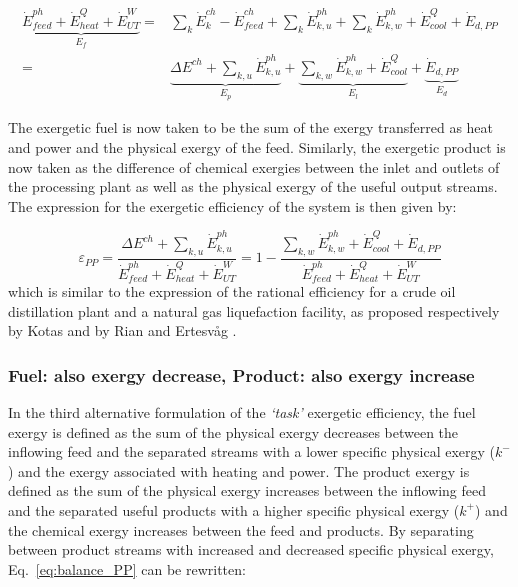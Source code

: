 \begin{align}
	\underbrace{\dot{E}^{ph}_{feed}+\dot{E}^{Q}_{heat}+\dot{E}^{W}_{UT}}_{E_f}= &\sum_k\dot{E}^{ch}_k - \dot{E}^{ch}_{feed} + \sum_k\dot{E}^{ph}_{k,u} + \sum_k\dot{E}^{ph}_{k,w} + \dot{E}^{Q}_{cool}+\dot{E}_{d,PP} \nonumber \\
																						  =&\underbrace{\Delta E^{ch} + \sum_{k,u}\dot{E}^{ph}_{k,u}}_{E_p}+\underbrace{\sum_{k,w}\dot{E}^{ph}_{k,w} + \dot{E}^{Q}_{cool}}_{E_l}+\underbrace{\dot{E}_{d,PP}}_{E_d}	
\end{align}

The exergetic fuel is now taken to be the sum of the exergy transferred as heat and power and the physical exergy of the feed. Similarly, the exergetic product is now taken as the difference of chemical exergies between the inlet and outlets of the processing plant as well as the physical exergy of the useful output streams. The expression for the exergetic efficiency of the system is then given by:

\begin{equation}
	\varepsilon_{PP} =\frac{\Delta E^{ch} + \sum_{k,u}\dot{E}^{ph}_{k,u}}{\dot{E}^{ph}_{feed}+\dot{E}^{Q}_{heat}+\dot{E}^{W}_{UT}}=1-\frac{\sum_{k,w}\dot{E}^{ph}_{k,w} + \dot{E}^{Q}_{cool}+\dot{E}_{d,PP}}{\dot{E}^{ph}_{feed}+\dot{E}^{Q}_{heat}+\dot{E}^{W}_{UT}}
\end{equation}
which is similar to the expression of the rational efficiency for a crude oil distillation plant and a natural gas liquefaction facility, as proposed respectively by Kotas \cite{Kotas1995} and by Rian and Ertesv\aa g \cite{Rian2012}.



\subsubsection{Fuel: also exergy decrease, Product: also exergy increase}

In the third alternative formulation of the \emph{`task'} exergetic efficiency, the fuel exergy is defined as the sum of the physical exergy decreases between the inflowing feed and the separated streams with a lower specific physical exergy ($k^{-}$) and the exergy associated with heating and power. The product exergy is defined as the sum of the physical exergy increases between the inflowing feed and the separated useful products with a higher specific physical exergy ($k^{+}$) and the chemical exergy increases between the feed and products. By separating between product streams with increased and decreased specific physical exergy, Eq.~\ref{eq:balance_PP} can be rewritten:

